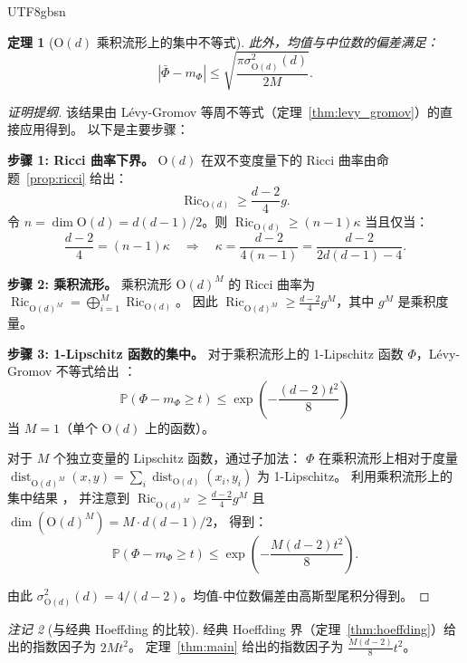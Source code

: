 \documentclass[12pt,a4paper]{article}
\theoremstyle{plain}
\newtheorem{theorem}{定理}[section]
\theoremstyle{definition}
\theoremstyle{remark}
\newtheorem{remark}[theorem]{注记}
\newcommand{\Pbb}{\mathbb{P}}
\newcommand{\Od}{\mathrm{O}(d)}
\DeclareMathOperator{\dist}{dist}
\DeclareMathOperator{\Ric}{Ric}
\begin{document}
\begin{CJK}{UTF8}{gbsn}
\begin{theorem}[$\Od$ 乘积流形上的集中不等式]
此外，均值与中位数的偏差满足：
\begin{equation}\label{eq:mean_median}
    |\bar{\Phi} - m_\Phi| \leq \sqrt{\frac{\pi \sigma_{\Od}^2(d)}{2M}}.
\end{equation}
\end{theorem}

\begin{proof}[证明提纲]
该结果由 Lévy-Gromov 等周不等式（定理~\ref{thm:levy_gromov}）的直接应用得到。
以下是主要步骤：

\textbf{步骤 1: Ricci 曲率下界。}
$\Od$ 在双不变度量下的 Ricci 曲率由命题~\ref{prop:ricci} 给出：
\begin{equation}
    \Ric_{\Od} \geq \frac{d-2}{4} g.
\end{equation}
令 $n = \dim \Od = d(d-1)/2$。则 $\Ric_{\Od} \geq (n-1)\kappa$ 当且仅当：
\begin{equation}
    \frac{d-2}{4} = (n-1)\kappa \quad\Longrightarrow\quad
    \kappa = \frac{d-2}{4(n-1)} = \frac{d-2}{2d(d-1)-4}.
\end{equation}

\textbf{步骤 2: 乘积流形。}
乘积流形 $\Od^M$ 的 Ricci 曲率为 $\Ric_{\Od^M} = \bigoplus_{i=1}^M \Ric_{\Od}$。
因此 $\Ric_{\Od^M} \geq \frac{d-2}{4} g^M$，其中 $g^M$ 是乘积度量。

\textbf{步骤 3: 1-Lipschitz 函数的集中。}
对于乘积流形上的 1-Lipschitz 函数 $\Phi$，Lévy-Gromov 不等式给出 \cite{ledoux2001, Theorem 5.3}：
\begin{equation}
    \Pbb(\Phi - m_\Phi \geq t) \leq \exp\!\left(-\frac{(d-2)t^2}{8}\right)
\end{equation}
当 $M = 1$（单个 $\Od$ 上的函数）。

对于 $M$ 个独立变量的 Lipschitz 函数，通过子加法：
$\Phi$ 在乘积流形上相对于度量 $\dist_{\Od^M}(x,y) = \sum_i \dist_{\Od}(x_i, y_i)$ 为 1-Lipschitz。
利用乘积流形上的集中结果 \cite{ledoux2001, Corollary 5.4}，
并注意到 $\Ric_{\Od^M} \geq \frac{d-2}{4} g^M$ 且 $\dim(\Od^M) = M \cdot d(d-1)/2$，
得到：
\begin{equation}
    \Pbb(\Phi - m_\Phi \geq t) \leq \exp\!\left(-\frac{M(d-2)t^2}{8}\right).
\end{equation}

由此 $\sigma_{\Od}^2(d) = 4/(d-2)$。均值-中位数偏差由高斯型尾积分得到。
\end{proof}

\begin{remark}[与经典 Hoeffding 的比较]
\label{rem:comparison}
经典 Hoeffding 界（定理~\ref{thm:hoeffding}）给出的指数因子为 $2M t^2$。
定理~\ref{thm:main} 给出的指数因子为 $\frac{M(d-2)}{8} t^2$。


\end{remark}
\end{CJK}
\end{document}
